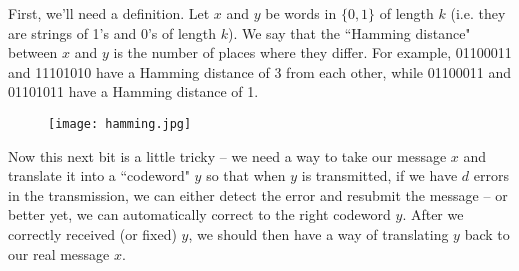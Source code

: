  \vspace{0.2cm}


First, we'll need a definition. Let $x$ and $y$ be words in $\{0,1\}$ of length $k$ (i.e. they are strings of 1's and 0's of length $k$). We say that the ``Hamming distance" between $x$ and $y$ is the number of places where they differ. For example, 01100011 and 11101010 have a Hamming distance of 3 from each other, while 01100011 and 01101011 have a Hamming distance of 1.

\begin{figure}[H]
   \centering
   \texttt{[image: hamming.jpg]} 
\end{figure}

Now this next bit is a little tricky -- we need a way to take our message $x$ and translate it into a ``codeword" $y$ so that when $y$ is transmitted, if we have $d$ errors in the transmission, we can either detect the error and resubmit the message -- or better yet, we can automatically correct to the right codeword $y$. After we correctly received (or fixed) $y$, we should then have a way of translating $y$ back to our real message $x$. \\

